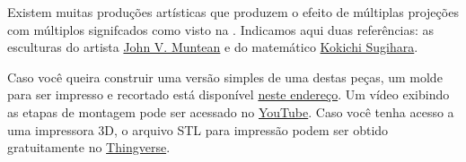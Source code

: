 \begin{knowledge}{}

Existem muitas produções artísticas que produzem o efeito de múltiplas projeções com múltiplos signifcados como visto na . Indicamos aqui duas referências: as esculturas do artista \href{https://www.jvmuntean.com/\#intro}{John V. Muntean} e do matemático \href{http://home.mims.meiji.ac.jp/~sugihara/Welcomee.html}{Kokichi Sugihara}.

Caso você queira construir uma versão simples de uma destas peças, um molde para ser impresso e recortado está disponível \href{https://goo.gl/ddFnuf}{neste endereço}. Um vídeo exibindo as etapas de montagem pode ser acessado no \href{https://youtu.be/QTNg0ofgB78}{YouTube}. Caso você tenha acesso a uma impressora 3D, o arquivo STL para impressão podem ser obtido gratuitamente no \href{https://www.thingiverse.com/thing:1657791}{Thingverse}.


\end{knowledge}


